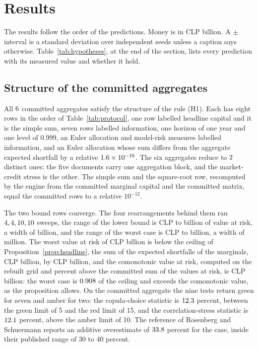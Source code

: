 \section{Results}
\label{sec:results}

The results follow the order of the predictions. Money is in CLP billion. A $\pm$ interval is a standard deviation over
independent seeds unless a caption says otherwise. Table~\ref{tab:hypotheses}, at the end of the section, lists every prediction
with its measured value and whether it held.

\subsection{Structure of the committed aggregates}
\label{sec:results-structure}

All $6$ committed aggregates satisfy the structure of the rule (H1). Each has eight rows in the order of
Table~\ref{tab:protocol}, one row labelled headline capital and it is the simple sum, seven rows labelled information, one horizon
of one year and one level of 0.999, an Euler allocation and model-risk measures labelled information, and an Euler allocation
whose sum differs from the aggregate expected shortfall by a relative $1.6\times 10^{-16}$. The six aggregates reduce to $2$
distinct ones: the five documents carry one aggregation block, and the market-credit stress is the other. The simple sum and the
square-root row, recomputed by the engine from the committed marginal capital and the committed matrix, equal the committed rows
to a relative $10^{-12}$.

The two bound rows converge. The four rearrangements behind them ran $4, 4, 10, 10$ sweeps, the range of the lower bound is CLP
\bdLowerRangeLo{} to \bdLowerRangeHi{} billion of value at risk, a width of \bdLowerRangeWidth{} billion, and the range of the
worst case is CLP \bdUpperRangeLo{} to \bdUpperRangeHi{} billion, a width of \bdUpperRangeWidth{} million. The worst value at risk
of CLP \bdWorstVar{} billion is below the ceiling of Proposition~\ref{prop:headline}, the sum of the expected shortfalls of the
marginals, CLP \bdSumEs{} billion, by CLP \bdSlack{} billion, and the comonotonic value at risk, computed on the rebuilt grid and \bdComoOverSum{} percent above the committed sum of the values at risk, is CLP \bdComoVar{} billion: the
worst case is $0.908$ of the ceiling and exceeds the comonotonic value, as the proposition allows. On the committed
aggregate the nine tests return green for seven and amber for two: the copula-choice statistic is $12.3$ percent, between
the green limit of 5 and the red limit of 15, and the correlation-stress statistic is $12.1$ percent, above the amber limit
of 10. The reference of Rosenberg and Schuermann reports an additive overestimate of $33.8$ percent for the case, inside their
published range of 30 to 40 percent.

